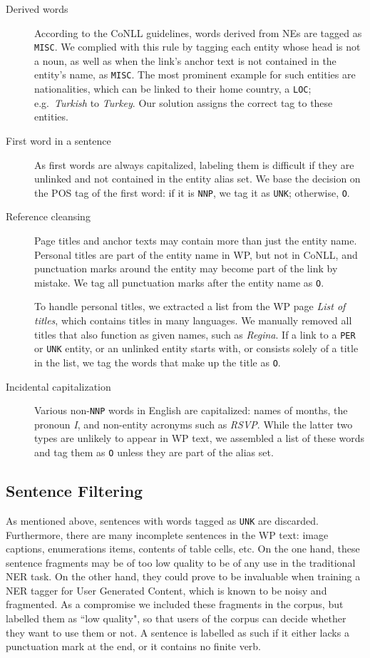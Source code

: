 \documentclass[11pt]{article}
\begin{document}
\begin{description}
\item[Derived words] According to the CoNLL guidelines, words derived from NEs are tagged as \texttt{MISC}. We complied with this rule by tagging each entity whose head is not a noun, as well as when the link's anchor text is not contained in the entity's name, as \texttt{MISC}. The most prominent example for such entities are nationalities, which can be linked to their home country, a \texttt{LOC}; e.g.~\textit{Turkish} to \textit{Turkey}. Our solution assigns the correct tag to these entities.
\item[First word in a sentence] As first words are always capitalized, labeling them is difficult if they are unlinked and not contained in the entity alias set. We base the decision on the POS tag of the first word: if it is \texttt{NNP}, we tag it as \texttt{UNK}; otherwise, \texttt{O}.
\item[Reference cleansing] Page titles and anchor texts may contain more than
  just the entity name. Personal titles are part of the entity name in WP, but
  not in CoNLL, and punctuation marks around the entity may become part of the
  link by mistake. We tag all punctuation marks after the entity name as
  \texttt{O}.
  
  To handle personal titles, we extracted a list from the WP page
  \textit{List of titles}, which contains titles in many languages. We
  manually removed all titles that also function as given names, such as
  \textit{Regina}. If a link to a \texttt{PER} or \texttt{UNK} entity, or an
  unlinked entity starts with, or consists solely of a title in the list, we
  tag the words that make up the title as \texttt{O}.
\item[Incidental capitalization] Various non-\texttt{NNP} words in English are
  capitalized: names of months, the pronoun \textit{I}, and non-entity
  acronyms such as \textit{RSVP}. While the latter two types are unlikely to
  appear in WP text, we assembled a list of these words and tag them as
  \texttt{O} unless they are part of the alias set.
\end{description}

\subsection{Sentence Filtering}

As mentioned above, sentences with words tagged as \texttt{UNK} are
discarded. Furthermore, there are many incomplete sentences in the WP text:
image captions, enumerations items, contents of table cells, etc. On the one
hand, these sentence fragments may be of too low quality to be of any use in
the traditional NER task. On the other hand, they could prove to be invaluable
when training a NER tagger for User Generated Content, which is known to be
noisy and fragmented. As a compromise we included these fragments in the
corpus, but labelled them as ``low quality", so that users of the corpus can
decide whether they want to use them or not. A sentence is labelled as such if
it either lacks a punctuation mark at the end, or it contains no finite verb.
\end{document}
